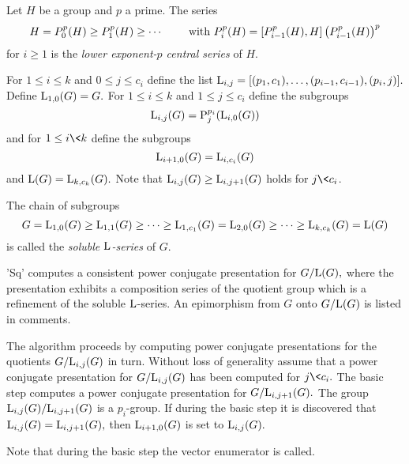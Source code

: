 Let  $H$ be a  group and  $p$ a  prime.  The  series  $$H = {P}^p_0(H)\ge
{P}^p_1(H)\ge\cdots\,\,\hbox  to  1.5   cm{\hfil  with\ }    {P}^p_i(H) =
[{P}^p_{i-1}(H),H] \left({P}^p_{i-1} (H)\right)^p$$ for $i  \ge 1$ is the
{\it lower exponent-$p$ central series} of $H.$

For $1 \le i \le k$ and $0 \le j \le  c_i$ define the list ${\rm L}_{i,j}
=   [(p_1,c_1),\ldots,  (p_{i-1},c_{i-1}),(p_{i}, j)    ].$ Define  ${\rm
L}_{1,0}(G) = G.$ For $1  \le i \le  k$ and $1  \le j \le c_i$ define the
subgroups  $${\rm L}_{i,j}(G) =  {\rm  P}_{j}^{p_i}( {\rm L}_{i,0}(G) )$$
and for $1  \le i \< k$ define the  subgroups $${\rm L}_{i+1,0}(G) = {\rm
L}_{i,c_i}(G)$$ and ${\rm L}(G)  = {\rm  L}_{k,c_k}(G).$ Note that  ${\rm
L}_{i,j}(G) \ge {\rm L}_{i,j+1}(G)$ holds for $j \< c_i$.

The chain of subgroups $$G  = {\rm L}_{1,0}(G)  \ge {\rm L}_{1,1}(G)  \ge
\cdots  \ge {\rm L}_{1,c_1}(G)    = {\rm L}_{2,0}(G)\ge \cdots   \ge {\rm
L}_{k,c_k}(G) = {\rm  L}(G)  $$   is   called  the  {\it  soluble   ${\rm
L}$-series} of $G.$

'Sq' computes  a  consistent  power  conjugate  presentation for  $G/{\rm
L}(G),$ where  the   presentation exhibits a  composition  series  of the
quotient group which is a refinement of the soluble ${\rm L}$-series.  An
epimorphism from $G$ onto $G/{\rm L}(G)$ is listed in comments.

The algorithm proceeds by computing power conjugate presentations for the
quotients  $G/{\rm L}_{i,j}(G)$ in   turn.   Without loss of   generality
assume that a  power conjugate presentation  for $G/{\rm L}_{i,j}(G)$ has
been computed  for $j \< c_i.$ The basic step computes a  power conjugate
presentation for $G/{\rm L}_{i,j+1}(G).$ The group ${\rm L}_{i,j}(G)/{\rm
L}_{i,j+1}(G)$  is  a  $p_{i}$-group.   If  during  the  basic step it is
discovered that ${\rm  L}_{i,j}(G)   = {\rm L}_{i,j+1}(G),$  then   ${\rm
L}_{i+1,0}(G)$ is set to ${\rm L}_{i,j}(G).$

Note that during the basic step the vector enumerator is called.


